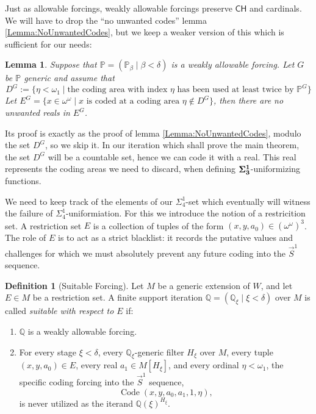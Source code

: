 \documentclass{article}
\theoremstyle{plain}
\newtheorem{lemma}[theorem]{Lemma}
\theoremstyle{definition}
\newtheorem{definition}[theorem]{Definition}
\newcommand{\forceP}{\mathbb{P}}
\newcommand{\forceQ}{\mathbb{Q}}
\newcommand{\code}{\operatorname{Code}}
\begin{document}
Just as allowable forcings, weakly allowable forcings preserve $\mathsf{CH}$ and cardinals. We will have to drop the ``no unwanted codes'' lemma \ref{Lemma:NoUnwantedCodes}, but we keep a weaker version of this which is sufficient for our needs:
\begin{lemma}
    Suppose that $\forceP= (\forceP_{\beta} \mid \beta < \delta)$ is a weakly allowable forcing. Let $G$ be $\forceP$ generic and assume that \[D^{G}:=\{ \eta < \omega_1 \mid \text{the coding area with index $\eta$ has been used at least twice by $\forceP^G$}  \} \]
    Let $E^G=\{x \in \omega^{\omega} \mid x \text{ is coded at a coding area $\eta \notin D^G$} \}$, then
    there are no unwanted reals in $E^G$.
\end{lemma}
Its proof is exactly as the proof of lemma \ref{Lemma:NoUnwantedCodes}, modulo the set $D^{G}$, so we skip it. In our iteration which shall prove the main theorem, the set $D^G$ will be a countable set, hence we can code it with a real. This real represents the coding areas we need to discard, when defining $\bf{\Sigma}^1_3$-uniformizing functions.

We need to keep track  of the elements of our $\Sigma^1_4$-set which eventually will witness the failure of $\Sigma^1_4$-uniformiation. For this we introduce the notion of a restricition set.  A restriction set $E$ is a collection of tuples of the form $(x, y, a_0) \in (\omega^\omega)^3$. The role of $E$ is to act as a strict blacklist: it records the putative values and challenges for which we must absolutely prevent any future coding into the $\vec{S}^1$ sequence. 

\begin{definition}[Suitable Forcing] \label{Def:Suitable}
Let $M$ be a generic extension of $W$, and let $E \in M$ be a restriction set. A finite support iteration $\forceQ = (\forceQ_\xi \mid \xi < \delta)$ over $M$ is called \emph{suitable with respect to $E$} if:
\begin{enumerate}
    \item $\forceQ$ is a weakly allowable forcing.
    \item For every stage $\xi < \delta$, every $\forceQ_\xi$-generic filter $H_\xi$ over $M$, every tuple $(x, y, a_0) \in E$, every real $a_1 \in M[H_\xi]$, and every ordinal $\eta < \omega_1$, the specific coding forcing into the $\vec{S}^1$ sequence,
    \[ \code(x, y, a_0, a_1, 1, \eta), \]
    is never utilized as the iterand $\forceQ(\xi)^{H_\xi}$.
\end{enumerate}
\end{definition}
\end{document}
